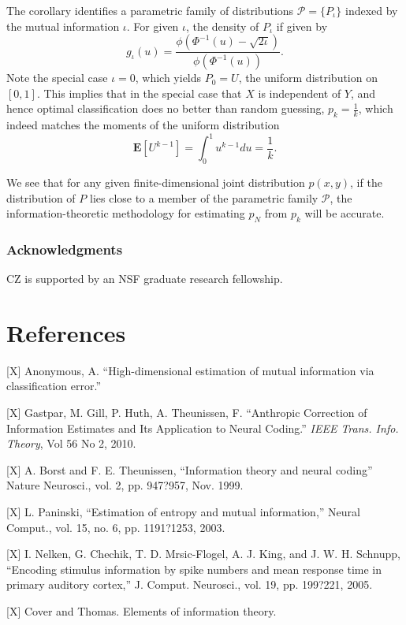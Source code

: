 \documentclass{article}
\newcommand{\E}{\textbf{E}}
\begin{document}
The corollary identifies a parametric family of distributions
$\mathcal{P} = \{P_\iota\}$ indexed by the mutual information $\iota$.
For given $\iota$, the density of $P_\iota$ if given by
\[
g_\iota(u) = \frac{\phi(\Phi^{-1}(u) - \sqrt{2\iota})}{\phi(\Phi^{-1}(u))}.
\]
Note the special case $\iota = 0$, which yields $P_0 = U$, the uniform
distribution on $[0,1]$.  This implies that in the special case that
$X$ is independent of $Y$, and hence optimal classification does no
better than random guessing, $p_k = \frac{1}{k}$, which indeed matches
the moments of the uniform distribution
\[
\E[U^{k-1}] = \int_0^1 u^{k-1} du = \frac{1}{k}.
\]

We see that for any given finite-dimensional joint distribution $p(x,
y)$, if the distribution of $P$ lies close to a member of the
parametric family $\mathcal{P}$, the information-theoretic methodology
for estimating $p_N$ from $p_k$ will be accurate.

\subsubsection*{Acknowledgments}

CZ is supported by an NSF graduate research fellowship.

\section*{References}

\small

[X] Anonymous, A. ``High-dimensional estimation of mutual information
via classification error.''

[X] Gastpar, M.  Gill, P.  Huth, A.  Theunissen, F. ``Anthropic
Correction of Information Estimates and Its Application to Neural
Coding.'' \emph{IEEE Trans. Info. Theory}, Vol 56 No 2, 2010.

[X] A. Borst and F. E. Theunissen, ``Information theory and neural coding''
Nature Neurosci., vol. 2, pp. 947?957, Nov. 1999.

[X] L. Paninski, ``Estimation of entropy and mutual information,'' Neural
Comput., vol. 15, no. 6, pp. 1191?1253, 2003.

[X] I. Nelken, G. Chechik, T. D. Mrsic-Flogel, A. J. King, and J. W. H.
Schnupp, ``Encoding stimulus information by spike numbers and mean
response time in primary auditory cortex,'' J. Comput. Neurosci., vol.
19, pp. 199?221, 2005.

[X] Cover and Thomas.  Elements of information theory.
\end{document}
